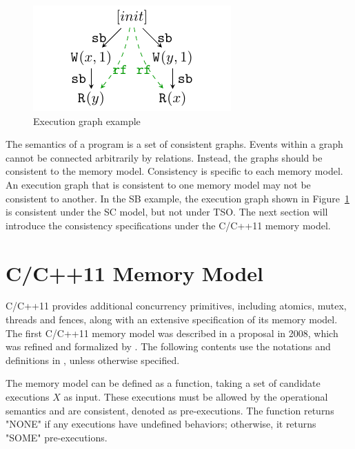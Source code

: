 \begin{figure}[h!tbp]
	\centering
	\includegraphics[scale=1.3]{figure/exec-graph/example0.pdf} 
	\caption{Execution graph example} 
	\label{graph-example} 
\end{figure}


The semantics of a program is a set of consistent graphs.  Events within a graph cannot be connected arbitrarily by relations. Instead, the graphs should be consistent to the memory model. Consistency is specific to each memory model. An execution graph that is consistent to one memory model may not be consistent to another. In the SB example, the execution graph shown in Figure~\ref{graph-example} is consistent under the SC model, but not under TSO. The next section will introduce the consistency specifications under the C/C++11 memory model.



\section{C/C++11 Memory Model}
C/C++11 provides additional concurrency primitives, including atomics, mutex, threads and fences, along with an extensive specification of its memory model.
The first C/C++11 memory model was described in a proposal\cite{c++model-proposal} in 2008, which was refined and formalized by \cite{c++model}. The following contents use the notations and definitions in \cite{c++model}, unless otherwise specified.

The memory model can be defined as a function, taking a set of candidate executions $X$ as input. These executions must be allowed by the operational semantics and are consistent, denoted as pre-executions. The function returns "NONE" if any executions have undefined behaviors; otherwise, it returns "SOME" pre-executions.

